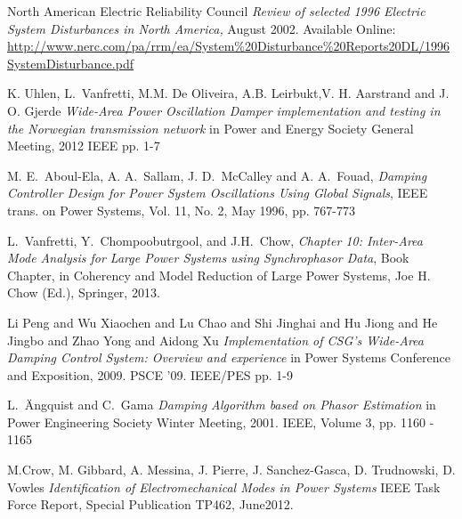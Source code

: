 \documentclass[conference]{IEEEtran}
\begin{document}
%
%
%
\begin{thebibliography}{1}

 North American Electric Reliability Council \emph{Review of selected 1996 Electric System Disturbances in North America,} August 2002. Available Online: \url{http://www.nerc.com/pa/rrm/ea/System\%20Disturbance\%20Reports20DL/1996SystemDisturbance.pdf}

 K. Uhlen, L.~Vanfretti, M.M. De Oliveira, A.B. Leirbukt,V. H. Aarstrand and J. O. Gjerde \emph{Wide-Area Power Oscillation Damper implementation and testing in the Norwegian transmission network} in Power and Energy Society General Meeting, 2012 IEEE pp. 1-7

  M. E.~Aboul-Ela, A. A.~Sallam, J. D.~McCalley and A. A.~Fouad, \emph{Damping Controller Design for Power System Oscillations Using Global Signals}, IEEE trans. on Power Systems, Vol. 11, No. 2, May 1996, pp. 767-773

  L.~Vanfretti, Y.~Chompoobutrgool, and J.H.~Chow, \emph{Chapter 10: Inter-Area Mode Analysis for Large Power Systems using Synchrophasor Data}, Book Chapter, in Coherency and Model Reduction of Large Power Systems, Joe H. Chow (Ed.), Springer, 2013.

 Li Peng and Wu Xiaochen and Lu Chao and Shi Jinghai and Hu Jiong and He Jingbo and Zhao Yong and Aidong Xu \emph{Implementation of CSG's Wide-Area Damping Control System: Overview and experience} in Power Systems Conference and Exposition, 2009. PSCE '09. IEEE/PES pp. 1-9

 L.~\"{A}ngquist and C.~Gama  \emph{Damping Algorithm based on Phasor Estimation} in Power Engineering Society Winter Meeting, 2001. IEEE, Volume 3, pp. 1160 - 1165  

 M.Crow, M. Gibbard, A. Messina, J. Pierre, J. Sanchez-Gasca, D. Trudnowski, D. Vowles \emph{Identification of Electromechanical Modes in Power Systems} IEEE Task Force Report, Special Publication TP462, June2012.


\end{thebibliography}
\end{document}
